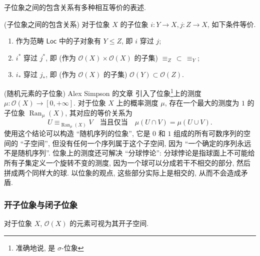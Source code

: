 子位象之间的包含关系有多种相互等价的表述.

\begin{prop}
	{(子位象之间的包含关系)}
	对于位象 $X$ 的子位象 $i\colon Y\to X,j\colon Z\to X$, 如下条件等价.
	\begin{enumerate}[(1)]
		\item 作为范畴 $\mathsf {Loc}$ 中的子对象有 $Y\leq Z$, 即 $i$ 穿过 $j$;
		\item $i^*$ 穿过 $j^*$, 即 (作为 $\mathcal O(X)\times\mathcal O(X)$ 的子集) $\equiv_Z \,\subset\, \equiv_Y$;
		\item $i_*$ 穿过 $j_*$, 即 (作为 $\mathcal O(X)$ 的子集) $\mathcal O(Y) \subset \mathcal O(Z)$.
	\end{enumerate}
\end{prop}

\begin{example}
	{(随机元素的子位象)}
	Alex Simpson 的文章 \cite{SIMPSON20121642} 引入了位象\footnote{准确地说, 是 $\sigma$-位象}上的测度 $\mu\colon \mathcal O(X)\to [0,+\infty]$. 对于位象 $X$ 上的概率测度 $\mu$, 存在一个最大的测度为 $1$ 的子位象 $\operatorname{Ran}_\mu(X)$, 其对应的等价关系为
	$$
	U\equiv_{\operatorname{Ran}_\mu(X)} V \quad \text{当且仅当}\quad \mu(U\cap V) = \mu(U\cup V).
	$$
	使用这个结论可以构造 ``随机序列的位象'', 它是 $0$ 和 $1$ 组成的所有可数序列的空间的 ``子空间'', 但没有任何一个序列属于这个子空间, 因为 ``一个确定的序列永远不是随机序列''. 位象上的测度还可解决 ``分球悖论'': 分球悖论是指球面上不可能给所有子集定义一个旋转不变的测度, 因为一个球可以分成若干不相交的部分, 然后拼成两个同样大的球. 以位象的观点, 这些部分实际上是相交的, 从而不会造成矛盾.
\end{example}

\subsubsection{开子位象与闭子位象}

对于位象 $X$, $\mathcal O(X)$ 的元素可视为其开子空间.

